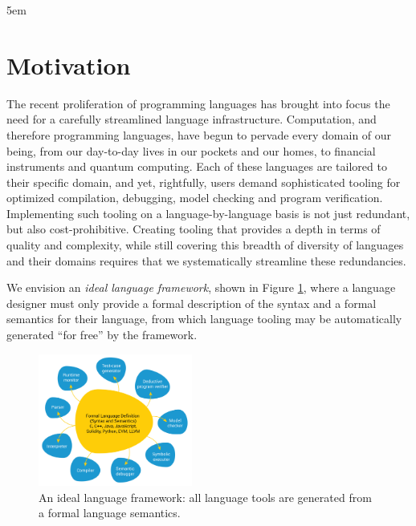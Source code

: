 \emergencystretch 5em

\hypertarget{sec:introduction}{%
\section{Motivation}\label{sec:introduction}}

The recent proliferation of programming languages has brought into focus the
need for a carefully streamlined language infrastructure.
Computation, and therefore programming languages, have begun to pervade every
domain of our being, from our day-to-day lives in our pockets and our homes,
to financial instruments and quantum computing.
Each of these languages are tailored to their specific domain, and yet, rightfully,
users demand sophisticated tooling for optimized compilation, debugging, model
checking and program verification.
Implementing such tooling on a language-by-language basis is not just redundant,
but also cost-prohibitive.
Creating tooling that provides a depth in terms of quality and complexity,
while still covering this breadth of diversity of languages and their domains
requires that we systematically streamline these redundancies.

We envision an \emph{ideal language framework}, shown in Figure \ref{fig:ideal-framework},
where a language designer must only provide
a formal description of the syntax
and a formal semantics for their language,
from which language tooling may be automatically generated ``for free'' by the framework.

\begin{figure}
\hypertarget{fig:ideal-framework}{%
\centering
\includegraphics[width=0.45\textwidth,height=\textheight]{figs/ideal.png}
\caption{An ideal language framework: all language tools are generated from a formal language semantics.}\label{fig:ideal-framework}
}
\end{figure}

